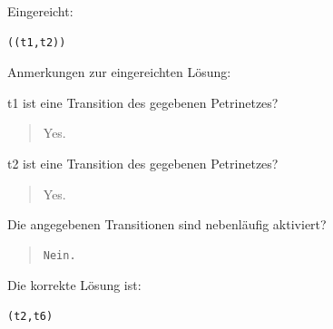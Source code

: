Eingereicht:


\begin{verbatim}
((t1,t2))
\end{verbatim}


Anmerkungen zur eingereichten Lösung:

t1 ist eine Transition des gegebenen Petrinetzes?\begin{quote}Yes.\end{quote}t2 ist eine Transition des gegebenen Petrinetzes?\begin{quote}Yes.\end{quote}Die angegebenen Transitionen sind nebenläufig aktiviert?

\begin{quote}
\begin{verbatim}
Nein.
\end{verbatim}
\end{quote}

Die korrekte Lösung ist:
\begin{verbatim}
(t2,t6)
\end{verbatim}


